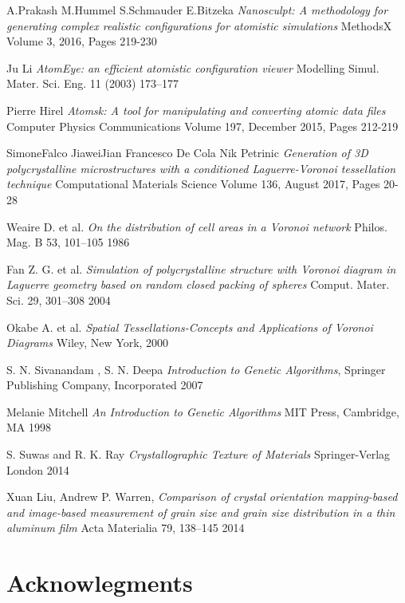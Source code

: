 \documentclass{article}
\begin{document}
\begin{thebibliography}{9}
  A.Prakash M.Hummel S.Schmauder E.Bitzeka
  \textit{Nanosculpt: A methodology for generating complex realistic configurations for atomistic simulations}
 MethodsX
Volume 3, 2016, Pages 219-230

  Ju Li
  \textit{AtomEye: an efficient atomistic configuration viewer}
 Modelling Simul. Mater. Sci. Eng. 11 (2003) 173–177

  Pierre Hirel
  \textit{Atomsk: A tool for manipulating and converting atomic data files}
 Computer Physics Communications
Volume 197, December 2015, Pages 212-219

  SimoneFalco JiaweiJian Francesco De Cola Nik Petrinic
  \textit{Generation of 3D polycrystalline microstructures with a conditioned Laguerre-Voronoi tessellation technique}
 Computational Materials Science
Volume 136, August 2017, Pages 20-28


  Weaire D. et al. 
  \textit{On the distribution of cell areas in a Voronoi network}
  Philos. Mag. B 53, 101–105 
  1986

  Fan Z. G. et al. 
  \textit{Simulation of polycrystalline structure with Voronoi diagram in Laguerre geometry    based on random closed packing of spheres} 
  Comput. Mater. Sci. 29, 301–308 
  2004

Okabe A. et al. 
\textit{Spatial Tessellations-Concepts and Applications of Voronoi Diagrams}
Wiley, New York, 
2000

  S. N. Sivanandam , S. N. Deepa
  \textit{Introduction to Genetic Algorithms},
  Springer Publishing Company, Incorporated
  2007

  Melanie Mitchell
  \textit{An Introduction to Genetic Algorithms}
  MIT Press, Cambridge, MA
 1998

  S. Suwas and R. K. Ray
  \textit{Crystallographic Texture of Materials}
  Springer-Verlag London 
  2014

  Xuan Liu, Andrew P. Warren,
  \textit{Comparison of crystal orientation mapping-based and image-based measurement of grain size and grain size distribution in a thin aluminum film}
  Acta Materialia 79, 138–145
  2014

\end{thebibliography}


\section{Acknowlegments}
\end{document}
